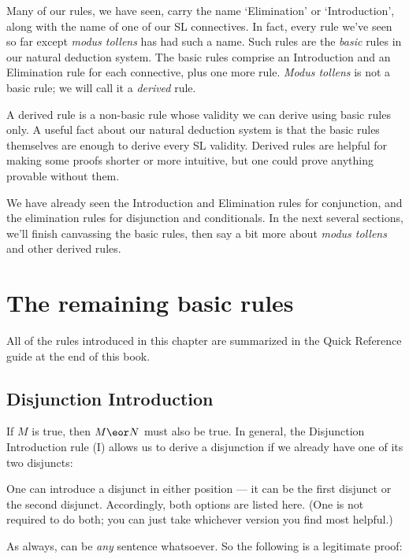 Many of our rules, we have seen, carry the name `Elimination' or `Introduction', along with the name of one of our SL connectives. In fact, every rule we've seen so far except \emph{modus tollens} has had such a name. Such rules are the \emph{basic} rules in our natural deduction system. The basic rules comprise an Introduction and an Elimination rule for each connective, plus one more rule. \emph{Modus tollens} is not a basic rule; we will call it a \emph{derived} rule.

A derived rule is a non-basic rule whose validity we can derive using basic rules only. A useful fact about our natural deduction system is that the basic rules themselves are enough to derive every SL validity. Derived rules are helpful for making some proofs shorter or more intuitive, but one could prove anything provable without them.

We have already seen the Introduction and Elimination rules for conjunction, and the elimination rules for disjunction and conditionals. In the next several sections, we'll finish canvassing the basic rules, then say a bit more about \emph{modus tollens} and other derived rules.

\section{The remaining basic rules}

All of the rules introduced in this chapter are summarized in the Quick Reference guide at the end of this book.

\subsection{Disjunction Introduction}
If $M$ is true, then $M \eor N$ must also be true. In general, the Disjunction Introduction rule ({\eor}I) allows us to derive a disjunction if we already have one of its two disjuncts:

\begin{ndproof}
	\metaA{}
\end{ndproof}

One can introduce a disjunct in either position --- it can be the first disjunct or the second disjunct. Accordingly, both options are listed here. (One is not required to do both; you can just take whichever version you find most helpful.)

As always, \metaB{} can be \emph{any} sentence whatsoever. So the following is a legitimate proof:

